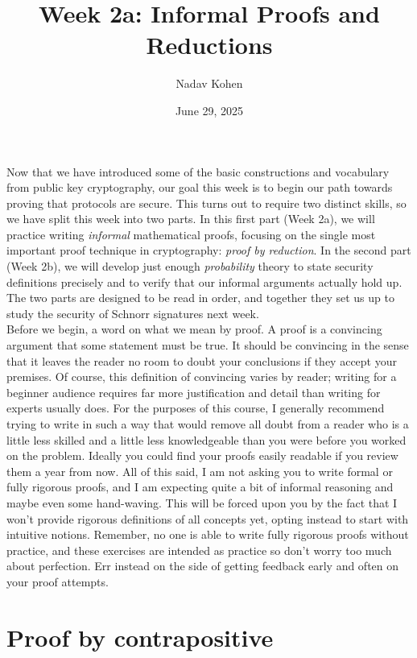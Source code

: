 \documentclass[12pt]{article}
\theoremstyle{definition}
\theoremstyle{remark}
\theoremstyle{definition}
\begin{document}
\title{Week 2a: Informal Proofs and Reductions}
\author{Nadav Kohen}
\date{June 29, 2025}
\maketitle

Now that we have introduced some of the basic constructions and vocabulary from public key cryptography, our goal this week is to begin our path towards proving that protocols are secure. This turns out to require two distinct skills, so we have split this week into two parts. In this first part (Week 2a), we will practice writing \emph{informal} mathematical proofs, focusing on the single most important proof technique in cryptography: \emph{proof by reduction}. In the second part (Week 2b), we will develop just enough \emph{probability} theory to state security definitions precisely and to verify that our informal arguments actually hold up. The two parts are designed to be read in order, and together they set us up to study the security of Schnorr signatures next week.\\

Before we begin, a word on what we mean by proof. A proof is a convincing argument that some statement must be true. It should be convincing in the sense that it leaves the reader no room to doubt your conclusions if they accept your premises. Of course, this definition of convincing varies by reader; writing for a beginner audience requires far more justification and detail than writing for experts usually does. For the purposes of this course, I generally recommend trying to write in such a way that would remove all doubt from a reader who is a little less skilled and a little less knowledgeable than you were before you worked on the problem. Ideally you could find your proofs easily readable if you review them a year from now. All of this said, I am not asking you to write formal or fully rigorous proofs, and I am expecting quite a bit of informal reasoning and maybe even some hand-waving. This will be forced upon you by the fact that I won't provide rigorous definitions of all concepts yet, opting instead to start with intuitive notions. Remember, no one is able to write fully rigorous proofs without practice, and these exercises are intended as practice so don't worry too much about perfection. Err instead on the side of getting feedback early and often on your proof attempts.

\section*{Proof by contrapositive}
\end{document}
